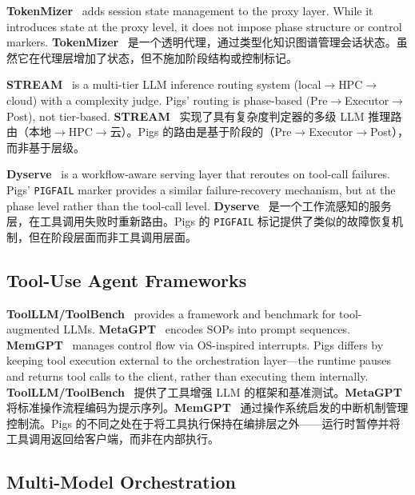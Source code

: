 \textbf{TokenMizer}~\citep{liu2026tokenmizer} adds session state management to the proxy layer. While it introduces state at the proxy level, it does not impose phase structure or control markers.
\textbf{TokenMizer}~\citep{liu2026tokenmizer} 是一个透明代理，通过类型化知识图谱管理会话状态。虽然它在代理层增加了状态，但不施加阶段结构或控制标记。

\textbf{STREAM}~\citep{stream2026} is a multi-tier LLM inference routing system (local$\rightarrow$HPC$\rightarrow$cloud) with a complexity judge. Pigs' routing is phase-based (Pre$\rightarrow$Executor$\rightarrow$Post), not tier-based.
\textbf{STREAM}~\citep{stream2026} 实现了具有复杂度判定器的多级 LLM 推理路由（本地$\rightarrow$HPC$\rightarrow$云）。Pigs 的路由是基于阶段的（Pre$\rightarrow$Executor$\rightarrow$Post），而非基于层级。

\textbf{Dyserve}~\citep{dyserve2027} is a workflow-aware serving layer that reroutes on tool-call failures. Pigs' \texttt{PIGFAIL} marker provides a similar failure-recovery mechanism, but at the phase level rather than the tool-call level.
\textbf{Dyserve}~\citep{dyserve2027} 是一个工作流感知的服务层，在工具调用失败时重新路由。Pigs 的 \texttt{PIGFAIL} 标记提供了类似的故障恢复机制，但在阶段层面而非工具调用层面。

\subsection{Tool-Use Agent Frameworks}

\textbf{ToolLLM/ToolBench}~\citep{qin2023toolllm} provides a framework and benchmark for tool-augmented LLMs. \textbf{MetaGPT}~\citep{hong2023metagpt} encodes SOPs into prompt sequences. \textbf{MemGPT}~\citep{packer2023memgpt} manages control flow via OS-inspired interrupts. Pigs differs by keeping tool execution external to the orchestration layer---the runtime pauses and returns tool calls to the client, rather than executing them internally.
\textbf{ToolLLM/ToolBench}~\citep{qin2023toolllm} 提供了工具增强 LLM 的框架和基准测试。\textbf{MetaGPT}~\citep{hong2023metagpt} 将标准操作流程编码为提示序列。\textbf{MemGPT}~\citep{packer2023memgpt} 通过操作系统启发的中断机制管理控制流。Pigs 的不同之处在于将工具执行保持在编排层之外——运行时暂停并将工具调用返回给客户端，而非在内部执行。

\subsection{Multi-Model Orchestration}

